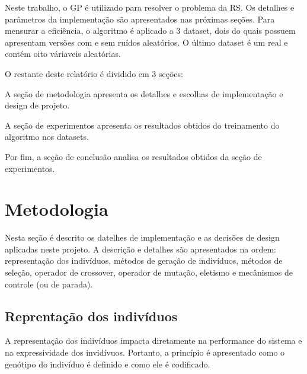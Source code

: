 \documentclass[a4paper]{paper}
\begin{document}
\begin{center}
\end{center}

Neste trabalho, o GP é utilizado para resolver o problema da RS. Os detalhes e
parâmetros da implementação são apresentados nas próximas seções. Para mensurar
a eficiência, o algoritmo é aplicado a 3 dataset, dois do quais possuem
apresentam versões com e sem ruídos aleatórios. O último dataset é um real e
contém oito váriaveis aleatórias.

O restante deste relatório é dividido em 3 seções: 
\begin{ilist}
\item A seção de metodologia apresenta os detalhes e escolhas de implementação
  e design de projeto.
\item A seção de experimentos apresenta os resultados obtidos do treinamento
  do algoritmo nos datasets.
\item Por fim, a seção de conclusão analisa os resultados obtidos da seção de
  experimentos.
\end{ilist}

\section{Metodologia} \label{sec:metodologia}
Nesta seção é descrito os datelhes de implementação e as decisões de design
aplicadas neste projeto. A descrição e detalhes são apresentados na ordem:
representação dos indivíduos, métodos de geração de indivíduos, métodos de
seleção, operador de crossover, operador de mutação, eletismo e mecânismos de
controle (ou de parada).

\subsection{Reprentação dos indivíduos} \label{subsec:representacao}
A representação dos indivíduos impacta diretamente na performance do sistema e
na expressividade dos invidívuos. Portanto, a princípio é apresentado como o
genótipo do indivíduo é definido e como ele é codificado.
\end{document}
